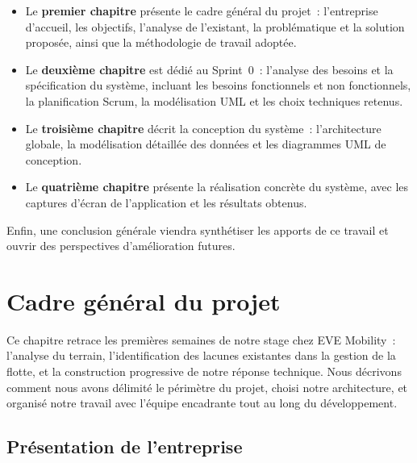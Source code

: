 \documentclass[12pt, a4paper]{report}
\begin{document}
\begin{itemize}
  \item Le \textbf{premier chapitre} présente le cadre général du projet~: l'entreprise
        d'accueil, les objectifs, l'analyse de l'existant, la problématique et la solution
        proposée, ainsi que la méthodologie de travail adoptée.

  \item Le \textbf{deuxième chapitre} est dédié au Sprint~0~: l'analyse des besoins
        et la spécification du système, incluant les besoins fonctionnels et non fonctionnels,
        la planification Scrum, la modélisation UML et les choix techniques retenus.

  \item Le \textbf{troisième chapitre} décrit la conception du système~: l'architecture
        globale, la modélisation détaillée des données et les diagrammes UML de conception.

  \item Le \textbf{quatrième chapitre} présente la réalisation concrète du système,
        avec les captures d'écran de l'application et les résultats obtenus.
\end{itemize}

Enfin, une conclusion générale viendra synthétiser les apports de ce travail et ouvrir
des perspectives d'amélioration futures.

\chapter{Cadre général du projet}

\begin{chapterintro}
Ce chapitre retrace les premières semaines de notre stage chez EVE Mobility~: l'analyse
du terrain, l'identification des lacunes existantes dans la gestion de la flotte, et la
construction progressive de notre réponse technique. Nous décrivons comment nous avons
délimité le périmètre du projet, choisi notre architecture, et organisé notre travail
avec l'équipe encadrante tout au long du développement.
\end{chapterintro}

\section{Présentation de l'entreprise}
\end{document}
